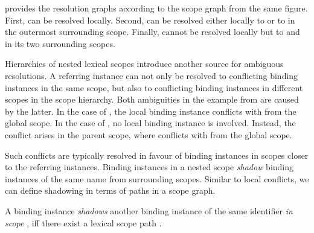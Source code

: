  provides the resolution graphs according to the scope graph from the same figure.
First,  can be resolved locally.
Second,  can be resolved 
  either locally to  
  or to  in the outermost surrounding scope.
Finally,  cannot be resolved locally but to
   and
   in its two surrounding scopes.



Hierarchies of nested lexical scopes introduce another source for ambiguous resolutions.
A referring instance can not only be resolved to conflicting binding instances in the same scope,
but also to conflicting binding instances in different scopes in the scope hierarchy.
Both ambiguities in the example from  are caused by the latter.
In the case of ,
  the local binding instance 
  conflicts with 
  from the global scope.
In the case of ,
  no local binding instance is involved.
  Instead, the conflict arises in the parent scope,
  where
    conflicts with 
    from the global scope.

Such conflicts are typically resolved in favour of binding instances
  in scopes closer to the referring instances.
Binding instances in a nested scope \emph{shadow} 
  binding instances of the same name from surrounding scopes.
Similar to local conflicts, we can define shadowing in terms of paths in a scope graph.

\begin{definition}
A binding instance 
  \emph{shadows} 
  another binding instance  
    of the same identifier 
  \emph{in scope },
  iff there exist a lexical scope path .
\end{definition}

